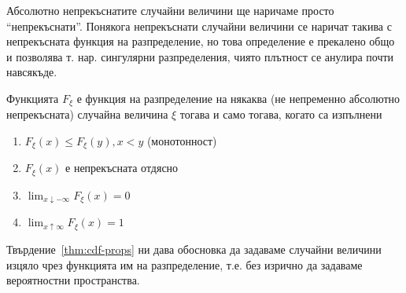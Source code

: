 \documentclass[numbers=endperiod, bibliography=totocnumbered]{scrartcl}
\begin{document}
\begin{note}
  Абсолютно непрекъснатите случайни величини ще наричаме просто \enquote{непрекъснати}. Понякога непрекъснати случайни величини се наричат такива с непрекъсната функция на разпределение, но това определение е прекалено общо и позволява т. нар. сингулярни разпределения, чиято плътност се анулира почти навсякъде.
\end{note}

\begin{proposition}\label{thm:cdf-props}
  Функцията \( F_\xi \) е функция на разпределение на някаква (не непременно абсолютно непрекъсната) случайна величина \( \xi \) тогава и само тогава, когато са изпълнени
  \begin{enumerate}
    \item \( F_\xi(x) \leq F_\xi(y), x < y \) (монотонност)
    \item \( F_\xi(x) \) е непрекъсната отдясно
    \item \( \lim_{x \downarrow -\infty} F_\xi(x) = 0 \)
    \item \( \lim_{x \uparrow \infty} F_\xi(x) = 1 \)
  \end{enumerate}
\end{proposition}

Твърдение~\ref{thm:cdf-props} ни дава обосновка да задаваме случайни величини изцяло чрез функцията им на разпределение, т.е. без изрично да задаваме вероятностни пространства.
\end{document}
